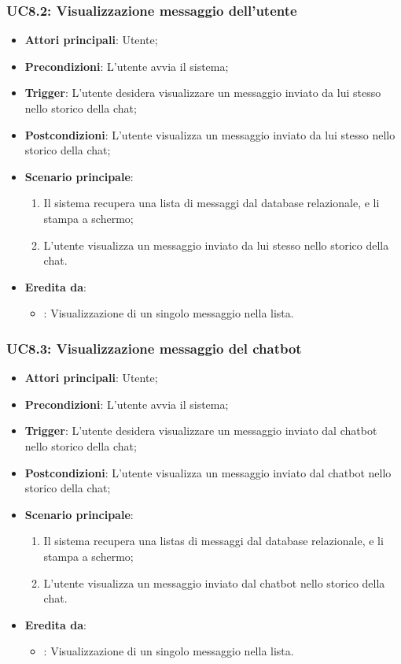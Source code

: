 \subsubsection{UC8.2: Visualizzazione messaggio dell'utente}
\begin{itemize}
    \item \textbf{Attori principali}: Utente;
    \item \textbf{Precondizioni}: L'utente avvia il sistema;
    \item \textbf{Trigger}: L'utente desidera visualizzare un messaggio inviato da lui stesso nello storico della chat;
    \item \textbf{Postcondizioni}: L'utente visualizza un messaggio inviato da lui stesso nello storico della chat;
    \item \textbf{Scenario principale}:
    \begin{enumerate}
        \item Il sistema recupera una lista di messaggi dal database relazionale, e li stampa a schermo;
        \item L'utente visualizza un messaggio inviato da lui stesso nello storico della chat.
    \end{enumerate}
    \item \textbf{Eredita da}:
    \begin{itemize}
        \item {}: Visualizzazione di un singolo messaggio nella lista.
    \end{itemize}
\end{itemize}

\hypertarget{UC8.3}{}
\subsubsection{UC8.3: Visualizzazione messaggio del chatbot}
\begin{itemize}
    \item \textbf{Attori principali}: Utente;
    \item \textbf{Precondizioni}: L'utente avvia il sistema;
    \item \textbf{Trigger}: L'utente desidera visualizzare un messaggio inviato dal chatbot nello storico della chat;
    \item \textbf{Postcondizioni}: L'utente visualizza un messaggio inviato dal chatbot nello storico della chat;
    \item \textbf{Scenario principale}:
    \begin{enumerate}
        \item Il sistema recupera una listas di messaggi dal database relazionale, e li stampa a schermo;
        \item L'utente visualizza un messaggio inviato dal chatbot nello storico della chat.
    \end{enumerate}
    \item \textbf{Eredita da}:
    \begin{itemize}
        \item {}: Visualizzazione di un singolo messaggio nella lista.
    \end{itemize}
\end{itemize}

